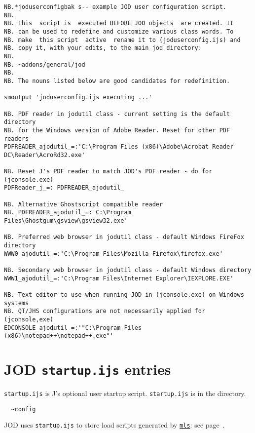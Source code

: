 \begin{lstlisting}[frame=single,framerule=0pt,basicstyle=\ttfamily\footnotesize]  
NB.*joduserconfigbak s-- example JOD user configuration script.
NB.
NB. This  script is  executed BEFORE JOD objects  are created. It
NB. can be used to redefine and customize various class words. To
NB. make  this script  active  rename it to (joduserconfig.ijs) and
NB. copy it, with your edits, to the main jod directory:
NB.
NB. ~addons/general/jod
NB.
NB. The nouns listed below are good candidates for redefinition.

smoutput 'joduserconfig.ijs executing ...'

NB. PDF reader in jodutil class - current setting is the default directory
NB. for the Windows version of Adobe Reader. Reset for other PDF readers
PDFREADER_ajodutil_=:'C:\Program Files (x86)\Adobe\Acrobat Reader DC\Reader\AcroRd32.exe'

NB. Reset J's PDF reader to match JOD's PDF reader - do for (jconsole.exe)
PDFReader_j_=: PDFREADER_ajodutil_

NB. Alternative Ghostscript compatible reader
NB. PDFREADER_ajodutil_=:'C:\Program Files\Ghostgum\gsview\gsview32.exe'

NB. Preferred web browser in jodutil class - default Windows FireFox directory
WWW0_ajodutil_=:'C:\Program Files\Mozilla Firefox\firefox.exe'

NB. Secondary web browser in jodutil class - default Windows directory
WWW1_ajodutil_=:'C:\Program Files\Internet Explorer\IEXPLORE.EXE'

NB. Text editor to use when running JOD in (jconsole.exe) on Windows systems
NB. QT/JHS configurations are not necessarily applied for (jconsole,exe)
EDCONSOLE_ajodutil_=:'"C:\Program Files (x86)\notepad++\notepad++.exe"'
\end{lstlisting}

   
   \newpage
   \section{JOD \texttt{startup.ijs} entries}\label{ap:startup}
   
\verb|startup.ijs| is J's optional user startup 
script. \verb|startup.ijs| is in the directory.
\begin{verbatim}
  ~config   
\end{verbatim}
JOD uses \verb|startup.ijs|
to store load scripts generated by \hyperlink{il:mls}{\texttt{mls}}: see page~\pageref{ss:mls}.
   

